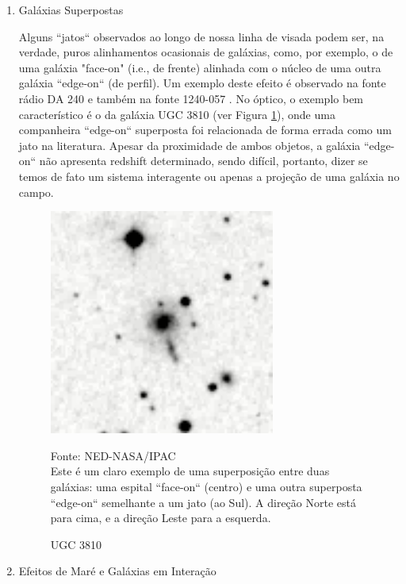 \begin{enumerate}
    \item Galáxias Superpostas

Alguns ``jatos`` observados ao longo de nossa linha de visada podem ser, na verdade, puros alinhamentos ocasionais de galáxias, como, por exemplo, o de uma galáxia "face-on" (i.e., de frente) alinhada com o núcleo de uma outra galáxia ``edge-on`` (de perfil). Um exemplo deste efeito é observado na fonte rádio DA 240 \cite{van1983radio} e também na fonte 1240-057 \cite{romanishin19841240}. No óptico, o exemplo bem característico é o da galáxia UGC 3810 (ver Figura \ref{fig:UGC-3810}), onde uma companheira ``edge-on`` superposta foi relacionada de forma errada como um jato na literatura. Apesar da proximidade de ambos objetos, a galáxia ``edge-on`` não apresenta redshift determinado, sendo difícil, portanto, dizer se temos de fato um sistema interagente ou apenas a projeção de uma galáxia no campo.

\begin{figure}[H]
	\centering	
    \caption{UGC 3810}
    \includegraphics[width=0.7\textwidth]{figuras/ugc3810.jpg}
   	\begin{center}
        \normalsize Fonte: NED-NASA/IPAC \\Este é um claro exemplo de uma superposição entre duas galáxias: uma espital ``face-on`` (centro) e uma outra superposta ``edge-on`` semelhante a um jato (ao Sul). A direção Norte está para cima, e a direção Leste para a esquerda.
    \end{center}
	\label{fig:UGC-3810}
\end{figure}

    \item Efeitos de Maré e Galáxias em Interação


\end{enumerate}
